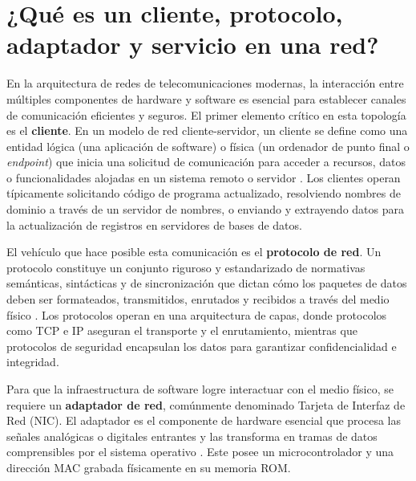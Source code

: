 \documentclass[a4paper,12pt]{article}
\begin{document}
\renewcommand{\footrulewidth}{0.4pt}  %

\setcounter{page}{1}

\tableofcontents


\newpage

\section{¿Qué es un cliente, protocolo, adaptador y servicio en una red?}
En la arquitectura de redes de telecomunicaciones modernas, la interacción entre múltiples componentes de hardware y software es esencial para establecer canales de comunicación eficientes y seguros. El primer elemento crítico en esta topología es el \textbf{cliente}. En un modelo de red cliente-servidor, un cliente se define como una entidad lógica (una aplicación de software) o física (un ordenador de punto final o \textit{endpoint}) que inicia una solicitud de comunicación para acceder a recursos, datos o funcionalidades alojadas en un sistema remoto o servidor \cite{ref1}. Los clientes operan típicamente solicitando código de programa actualizado, resolviendo nombres de dominio a través de un servidor de nombres, o enviando y extrayendo datos para la actualización de registros en servidores de bases de datos. 

El vehículo que hace posible esta comunicación es el \textbf{protocolo de red}. Un protocolo constituye un conjunto riguroso y estandarizado de normativas semánticas, sintácticas y de sincronización que dictan cómo los paquetes de datos deben ser formateados, transmitidos, enrutados y recibidos a través del medio físico \cite{ref2}. Los protocolos operan en una arquitectura de capas, donde protocolos como TCP e IP aseguran el transporte y el enrutamiento, mientras que protocolos de seguridad encapsulan los datos para garantizar confidencialidad e integridad.

Para que la infraestructura de software logre interactuar con el medio físico, se requiere un \textbf{adaptador de red}, comúnmente denominado Tarjeta de Interfaz de Red (NIC). El adaptador es el componente de hardware esencial que procesa las señales analógicas o digitales entrantes y las transforma en tramas de datos comprensibles por el sistema operativo \cite{ref5}. Este posee un microcontrolador y una dirección MAC grabada físicamente en su memoria ROM.
\end{document}
